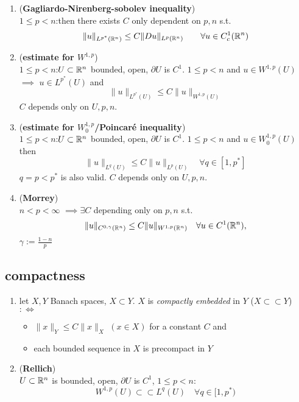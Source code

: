  \begin{enumerate}[label=(\alph*)]
 	\item (\textbf{Gagliardo-Nirenberg-sobolev inequality})\\
 	$1 \leq p <n$:\quad then there exists $C$ only dependent on $p,n$ s.t. 
 	\begin{equation*}
 		\|u\|_{L^{p^*}(\mathbb{R}^n)} \leq C \|Du\|_{L^p(\mathbb{R}^n)} \qquad \forall u \in C^1_c(\mathbb{R}^n)
 	\end{equation*}
 	\item (\textbf{estimate for $W^{1,p}$})\\
 	$1 \leq p < n$:\quad  $U \subset \mathbb{R}^n$ bounded, open, $\partial U$ is $C^1$. $1 \leq p < n$ and $u \in W^{1,p}(U)$ $\implies $  $u \in L^{p^*}(U)$ and 
 	\begin{equation*}
 		\|u\|_{L^{p^*}(U)} \leq C \|u\|_{W^{1,p}(U)}
 	\end{equation*} 
 	$C$ depends only on $U,p,n$.
 	
 	\item (\textbf{estimate for $W^{1,p}_0$/Poincaré inequality})\\
 	$1 \leq p < n$:\quad $U \subset \mathbb{R}^n$ bounded, open, $\partial U$ is $C^1$. $1 \leq p < n$ and $u \in W^{1,p}_0(U)$ then
  	\begin{equation*}
 		\|u\|_{L^{q}(U)} \leq C \|u\|_{L^{p}(U)} \quad \forall q \in [1,p^*]
 	\end{equation*} 
 	$q = p < p^*$ is also valid. $C$ depends only on $U,p,n$. 
 	
 	\item (\textbf{Morrey})\\
 	$n < p <\infty$ $\implies \exists C$ depending only on $p,n$ s.t. 
 	\begin{equation*}
 		\|u\|_{C^{0,\gamma}(\mathbb{R}^n)} \leq C \|u\|_{W^{1,p}(\mathbb{R}^n)} \quad \forall u \in C^1(\mathbb{R}^n),
 	\end{equation*}
 	$\gamma := \frac{1-n}{p}$
 \end{enumerate}

\subsection{compactness}

\begin{enumerate}[label=(\alph*)]
	\item let $X,Y$ Banach spaces, $X \subset Y$. $X$ is \textit{compactly embedded} in $Y$ ($X \subset \subset Y$) $:\iff$
	\begin{itemize}
		\item $\|x\|_Y \leq C \|x\|_X$ $(x \in X)$ for a constant $C$ and
		\item each bounded sequence in $X$ is precompact in $Y$	
	\end{itemize}

	\item (\textbf{Rellich})\\
	$U \subset \mathbb{R}^n$ is bounded, open, $\partial U$ is $C^1$, $1 \leq p <n$:
	\begin{equation*}
		W^{1,p}(U) \subset \subset L^q(U) \quad \forall q \in [1,p^*)
	\end{equation*}
\end{enumerate}

